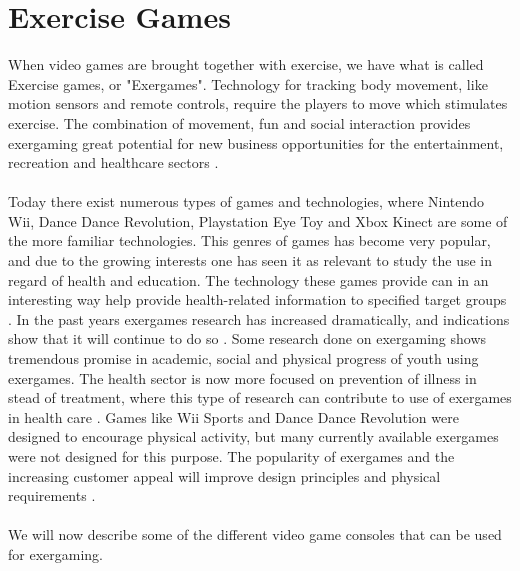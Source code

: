 \section{Exercise Games}
When video games are brought together with exercise, we have what is called Exercise games, or "Exergames". Technology for tracking body movement, like motion sensors and remote controls, require the players to move which stimulates exercise. The combination of movement, fun and social interaction provides exergaming great potential for new business opportunities for the entertainment, recreation and healthcare sectors \cite{gamingforhealth}. \\ \\
Today there exist numerous types of games and technologies, where Nintendo Wii, Dance Dance Revolution, Playstation Eye Toy and Xbox Kinect are some of the more familiar technologies. This genres of games has become very popular, and due to the growing interests one has seen it as relevant to study the use in regard of health and education. The technology these games provide can in an interesting way help provide health-related information to specified target groups \cite{gamingforhealth}. In the past years exergames research has increased dramatically, and indications show that it will continue to do so \cite{chamberlin2008exergames}. Some research done on exergaming shows tremendous promise in academic, social and physical progress of youth using exergames. The health sector is now more focused on prevention of illness in stead of treatment,  where this type of research can contribute to use of exergames in health care \cite{gamingforhealth}. Games like Wii Sports and Dance Dance Revolution were designed to encourage physical activity, but many currently available exergames were not designed for this purpose. The popularity of exergames and the increasing customer appeal will improve design principles and physical requirements \cite{chamberlin2008exergames}. \\ \\
We will now describe some of the different video game consoles that can be used for exergaming.
